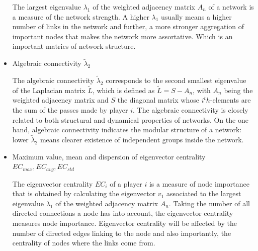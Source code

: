\documentclass{mcmthesis}
\begin{document}
\begin{itemize}
  The largest eigenvalue $\lambda_1$ of the weighted adjacency matrix $A_n$ of a network is a measure of the network strength. A higher $\lambda_1$ usually means a higher number of links in the network and further, a more stronger aggregation of important nodes that makes the network more assortative. Which is an important matrics of network structure.\cite{1}
  \item Algebraic connectivity $\tilde\lambda_2$
  
  The algebraic connectivity $\tilde\lambda_2$ corresponds to the second smallest eigenvalue of the Laplacian matrix $\tilde{L}$, which is defined as $\tilde{L} = S - A_n$, with $A_n$ being the weighted adjacency matrix and $S$ the diagonal matrix whose $i^th$-elements are the sum of the passes made by player $i$. The algebraic connectivity is closely related to both structural and dynamical properties of networks. On the one hand, algebraic connectivity indicates the modular structure of a network: lower $\tilde\lambda_2$ means clearer existence of independent groups inside the network.\cite{1}

  \item Maximum value, mean and dispersion of eigenvector centrality $EC_{max}, EC_{avg}, EC_{std}$
  
  The eigenvector centrality $EC_i$ of a player $i$ is a measure of node importance that is obtained by calculating the eigenvector $v_1$ associated to the largest eigenvalue $λ_1$ of the weighted adjacency matrix $A_n$. Taking the number of all directed connections a node has into account, the eigenvector centrality measures node importance. Eigenvector centrality will be affected by the number of directed edges linking to the node and also importantly, the centrality of nodes where the links come from.\cite{1}

\end{itemize}
\end{document}
